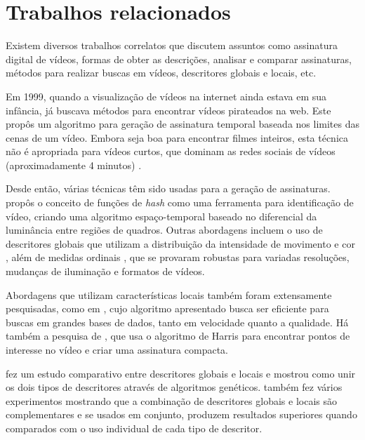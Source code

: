 \chapter{Trabalhos relacionados}
\label{chap:relacionados}


Existem diversos trabalhos correlatos que discutem assuntos como assinatura digital de vídeos, formas de obter as descrições, analisar e comparar assinaturas, métodos para realizar buscas em vídeos, descritores globais e locais, etc. 

Em 1999, quando a visualização de vídeos na internet ainda estava em sua infância, \citeauthor{indyk1999finding} já buscava métodos para encontrar vídeos pirateados na web. Este propôs um algoritmo para geração de assinatura temporal baseada nos limites das cenas de um vídeo. Embora seja boa para encontrar filmes inteiros, esta técnica não é apropriada para vídeos curtos, que dominam as redes sociais de vídeos (aproximadamente 4 minutos) \citeauthor{comscoreinc}.

Desde então, várias técnicas têm sido usadas para a geração de assinaturas. \citeauthor{coskun2006spatio} propôs o conceito de funções de \textit{hash} como uma ferramenta para identificação de vídeo, criando uma algoritmo espaço-temporal baseado no diferencial da luminância entre regiões de quadros. Outras abordagens incluem o uso de descritores globais que utilizam a distribuição da intensidade de movimento e cor \citeauthor{hampapur2001comparison}, além de medidas ordinais \citeauthor{hua2004robust}, que se provaram robustas para variadas resoluções, mudanças de iluminação e formatos de vídeos.	   	

Abordagens que utilizam características locais também foram extensamente pesquisadas, como em \citeauthor{joly2007content}, cujo algoritmo apresentado busca ser eficiente para buscas em grandes bases de dados, tanto em velocidade quanto a qualidade. Há também a  pesquisa de \citeauthor{law2006robust}, que usa o algoritmo de Harris para encontrar pontos de interesse no vídeo e criar uma assinatura compacta.

\citeauthor{de2012combinaccao} fez um estudo comparativo entre descritores globais e locais e mostrou como unir os dois tipos de descritores através de algoritmos genéticos. \citeauthor{de2012combinaccao} também fez vários experimentos mostrando que a combinação de descritores globais e locais são complementares e se usados em conjunto, produzem resultados superiores quando comparados com o uso individual de cada tipo de descritor.

